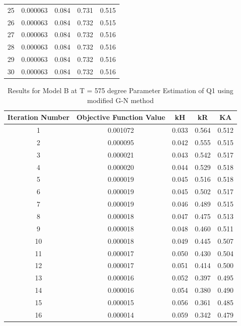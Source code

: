 \documentclass[a4paper,12pt]{article} %
\begin{document}
\begin{table}[ht]
\begin{tabular}{|c|c|c|c|c|}
        25 & 0.000063 & 0.084 & 0.731 & 0.515 \\
        26 & 0.000063 & 0.084 & 0.732 & 0.515 \\
        27 & 0.000063 & 0.084 & 0.732 & 0.516 \\
        28 & 0.000063 & 0.084 & 0.732 & 0.516 \\
        29 & 0.000063 & 0.084 & 0.732 & 0.516 \\
        30 & 0.000063 & 0.084 & 0.732 & 0.516 \\
        \hline
    \end{tabular}
    \end{table}
    
    \begin{table}[ht]
        \caption{Results for Model B at T = 575 degree Parameter Estimation of Q1 using modified G-N method}
        \centering
        \begin{tabular}{|c|c|c|c|c|}
            \hline
            Iteration Number & Objective Function Value & kH & kR & KA \\
            \hline   
            1 & 0.001072 & 0.033 & 0.564 & 0.512 \\
            2 & 0.000095 & 0.042 & 0.555 & 0.515 \\
            3 & 0.000021 & 0.043 & 0.542 & 0.517 \\
            4 & 0.000020 & 0.044 & 0.529 & 0.518 \\
            5 & 0.000019 & 0.045 & 0.516 & 0.518 \\
            6 & 0.000019 & 0.045 & 0.502 & 0.517 \\
            7 & 0.000019 & 0.046 & 0.489 & 0.515 \\
            8 & 0.000018 & 0.047 & 0.475 & 0.513 \\
            9 & 0.000018 & 0.048 & 0.460 & 0.511 \\
            10 & 0.000018 & 0.049 & 0.445 & 0.507 \\
            11 & 0.000017 & 0.050 & 0.430 & 0.504 \\
            12 & 0.000017 & 0.051 & 0.414 & 0.500 \\
            13 & 0.000016 & 0.052 & 0.397 & 0.495 \\
            14 & 0.000016 & 0.054 & 0.380 & 0.490 \\
            15 & 0.000015 & 0.056 & 0.361 & 0.485 \\
            16 & 0.000014 & 0.059 & 0.342 & 0.479 \\

\end{tabular}
\end{table}
\end{document}
